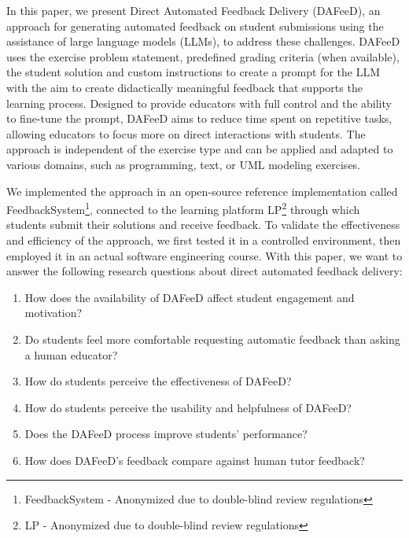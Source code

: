 \documentclass[sigconf,screen,review,anonymous]{acmart}
\begin{document}
In this paper, we present Direct Automated Feedback Delivery (DAFeeD), an approach for generating automated feedback on student submissions using the assistance of large language models (LLMs), to address these challenges.
DAFeeD uses the exercise problem statement, predefined grading criteria (when available), the student solution and custom instructions to create a prompt for the LLM with the aim to create didactically meaningful feedback that supports the learning process.
Designed to provide educators with full control and the ability to fine-tune the prompt, DAFeeD aims to reduce time spent on repetitive tasks, allowing educators to focus more on direct interactions with students.
The approach is independent of the exercise type and can be applied and adapted to various domains, such as programming, text, or UML modeling exercises.

We implemented the approach in an open-source reference implementation called FeedbackSystem\footnote{FeedbackSystem - Anonymized due to double-blind review regulations}, connected to the learning platform LP\footnote{LP - Anonymized due to double-blind review regulations} \cite{krusche:2018:ArTEMiSAutomaticAssessmentf} through which students submit their solutions and receive feedback.
To validate the effectiveness and efficiency of the approach, we first tested it in a controlled environment, then employed it in an actual software engineering course.
With this paper, we want to answer the following research questions about direct automated feedback delivery:

\begin{enumerate}[label=\textbf{RQ\arabic*},ref=RQ\arabic*]
  \item \label{RQ1} How does the availability of DAFeeD affect student engagement and motivation? 
  \item \label{RQ2} Do students feel more comfortable requesting automatic feedback than asking a human educator?
  \item \label{RQ3} How do students perceive the effectiveness of DAFeeD?
  \item \label{RQ4} How do students perceive the usability and helpfulness of DAFeeD?
  \item \label{RQ5} Does the DAFeeD process improve students' performance?
  \item \label{RQ6} How does DAFeeD's feedback compare against human tutor feedback?
\end{enumerate}
\end{document}
